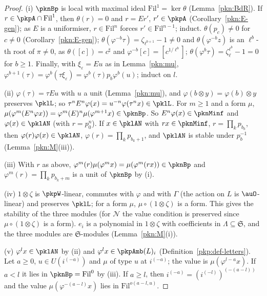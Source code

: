 \documentclass[10pt]{amsart}
\theoremstyle{definition}
\theoremstyle{remark}
\begin{document}
\begin{proof}
(i) $\pknBp$ is local with maximal ideal $\mathrm{Fil}^1=\ker\theta$ (Lemma~\ref{pkn:BdR}). If $r\in\pkpA\cap
\mathrm{Fil}^1$, then $\theta(r)=0$ and $r=Er'$, $r'\in\pkpA$ (Corollary~\ref{pkn:E-gen}); as $E$ is a uniformiser,
$r\in\mathrm{Fil}^n$ forces $r'\in\mathrm{Fil}^{n-1}$; induct. $\theta(p_c)\ne0$ for $c\ne0$
(Corollary~\ref{pkn:E-gen}); $\theta(\varphi^{-b}\tau)=\zeta_{\ell^{b+1}}-1\ne0$ and $\theta(\varphi^{-b}z)$ is an
$\ell^b$-th root of $\pi\ne0$, as $\theta([c])=c^\sharp$ and $\varphi^{-b}[c]=[c^{1/\ell^b}]$;
$\theta(\varphi^b\tau)=\zeta_\ell^{\ell^b}-1=0$ for $b\ge1$. Finally, with $\xi_\varepsilon=Eu$ as in
Lemma~\ref{pkn:mu}, $\varphi^{b+1}(\tau)=\varphi^b(\tau\xi_\varepsilon)=\varphi^b(\tau)p_b\varphi^b(u)$; induct
on $l$.

(ii) $\varphi(\tau)=\tau Eu$ with $u$ a unit (Lemma~\ref{pkn:mu}), and $\varphi(b\otimes y)=\varphi(b)\otimes y$
preserves $\pklL$; so $\tau^nE^n\varphi(x)=u^{-n}\varphi(\tau^nx)\in\pklL$. For $m\ge1$ and a form $\mu$,
$\mu(\varphi^m(E^n\varphi x))=\varphi^m(E)^n\mu(\varphi^{m+1}x)\in\pknBp$. So $E^n\varphi(x)\in\pknMinf$ and
$\varphi(x)\in\pklAN$ (with $r=p_0^n$). If $x\in\pklAN$ with $rx\in\pknMinf$, $r=\prod_kp_{b_k}$, then
$\varphi(r)\varphi(x)\in\pklAN$, $\varphi(r)=\prod_kp_{b_k+1}$, and $\pklAN$ is stable under $p_b^{-1}$
(Lemma~\ref{pkn:M}(iii)).

(iii) With $r$ as above, $\varphi^m(r)\mu(\varphi^mx)=\mu(\varphi^m(rx))\in\pknBp$ and $\varphi^m(r)=
\prod_kp_{b_k+m}$ is a unit of $\pknBp$ by (i).

(iv) $1\otimes\zeta$ is $\pkpW$-linear, commutes with $\varphi$ and with $\Gamma$ (the action on $L$ is
$\auO$-linear) and preserves $\pklL$; for a form $\mu$, $\mu\circ(1\otimes\zeta)$ is a form. This gives the
stability of the three modules (for $\mathcal N$ the value condition is preserved since
$\mu\circ(1\otimes\zeta)$ is a form). $e_i$ is a polynomial in $1\otimes\zeta$ with coefficients in
$\Lambda\subseteq\mathfrak S$, and the three modules are $\mathfrak S$-modules (Lemma~\ref{pkn:M}(i)).

(v) $\varphi^lx\in\pklAN$ by (ii) and $\varphi^lx\in\pkpAmb(L)_i$ (Definition~\ref{pkp:def-letters}). Let $a\ge0$,
$u\in U(i^{(-a)})$ and $\mu$ of type $u$ at $i^{(-a)}$; the value is $\mu(\varphi^{l-a}x)$. If $a<l$ it lies in
$\pknBp=\mathrm{Fil}^0$ by (iii). If $a\ge l$, then $i^{(-a)}=(i^{(-l)})^{(-(a-l))}$ and the value
$\mu(\varphi^{-(a-l)}x)$ lies in $\mathrm{Fil}^{o(a-l,u)}$.
\end{proof}
\end{document}
